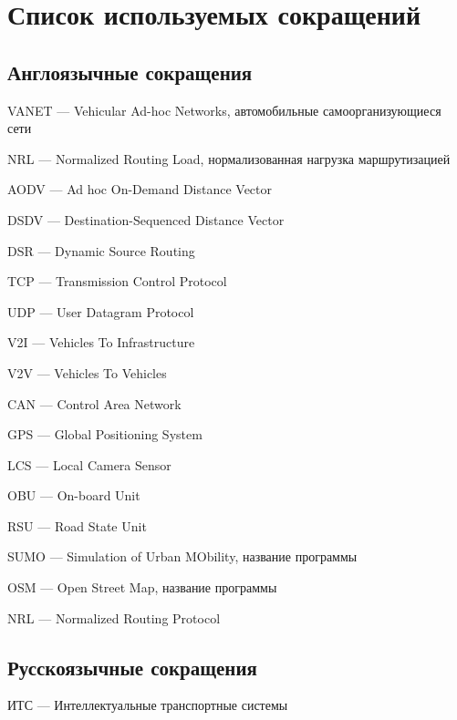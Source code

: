 \chapter*{Список используемых сокращений}

\section*{Англоязычные сокращения}

\mbox{}

VANET --- Vehicular Ad-hoc Networks, автомобильные самоорганизующиеся сети

NRL --- Normalized Routing Load, нормализованная нагрузка маршрутизацией

AODV --- Ad hoc On-Demand Distance Vector

DSDV --- Destination-Sequenced Distance Vector

DSR --- Dynamic Source Routing

TCP --- Transmission Control Protocol

UDP --- User Datagram Protocol

V2I --- Vehicles To Infrastructure

V2V --- Vehicles To Vehicles

CAN --- Control Area Network

GPS --- Global Positioning System

LCS --- Local Camera Sensor

OBU --- On-board Unit

RSU --- Road State Unit

SUMO --- Simulation of Urban MObility, название программы

OSM --- Open Street Map, название программы

NRL --- Normalized Routing Protocol

\section*{Русскоязычные сокращения}

\mbox{}

ИТС --- Интеллектуальные транспортные системы
